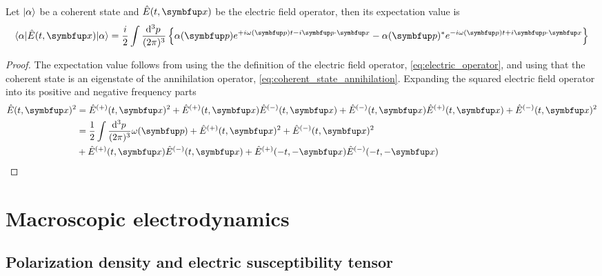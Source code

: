 \begin{theorem}
	Let $\lvert\alpha\rangle$ be a coherent state and $\hat{E}(t,\vb{x})$ be the electric field operator, then its expectation value is
	\begin{equation}
		\bra{\alpha}
		\hat{E}(t,\vb{x})
		\ket{\alpha}
		=
		\frac{i}{2}
		\int\frac{\dd[3]{p}}{(2\pi)^3}
		\left\{
			\alpha(\vb{p})
			e^{+i\omega(\vb{p})t-i\vb{p}\vdot\vb{x}}
			-
			\alpha(\vb{p})^*
			e^{-i\omega(\vb{p})t+i\vb{p}\vdot\vb{x}}
		\right\}
	\end{equation}
\end{theorem}
\begin{proof}
	The expectation value follows from using the the definition of the electric field operator, \cref{eq:electric_operator}, and using that the coherent state is an eigenstate of the annihilation operator, \cref{eq:coherent_state_annihilation}.
	Expanding the squared electric field operator into its positive and negative frequency parts
	\begin{equation}
		\begin{split}
			\hat{E}(t,\vb{x})^2
			&=
			\hat{E}^{(+)}(t,\vb{x})^2
			+
			\hat{E}^{(+)}(t,\vb{x})
			\hat{E}^{(-)}(t,\vb{x})
			+
			\hat{E}^{(-)}(t,\vb{x})
			\hat{E}^{(+)}(t,\vb{x})
			+
			\hat{E}^{(-)}(t,\vb{x})^2
			\\
			&=
			\frac{1}{2}
			\int\frac{\dd[3]{p}}{(2\pi)^3}
			\omega(\vb{p})
			+
			\hat{E}^{(+)}(t,\vb{x})^2
			+
			\hat{E}^{(-)}(t,\vb{x})^2
			\\
			&+
			\hat{E}^{(+)}(t,\vb{x})
			\hat{E}^{(-)}(t,\vb{x})
			+
			\hat{E}^{(+)}(-t,-\vb{x})
			\hat{E}^{(-)}(-t,-\vb{x})
		\end{split}
	\end{equation}
\end{proof}

\section{Macroscopic electrodynamics}

\subsection{Polarization density and electric susceptibility tensor}\label{sec:polarization_density_susceptibility}

